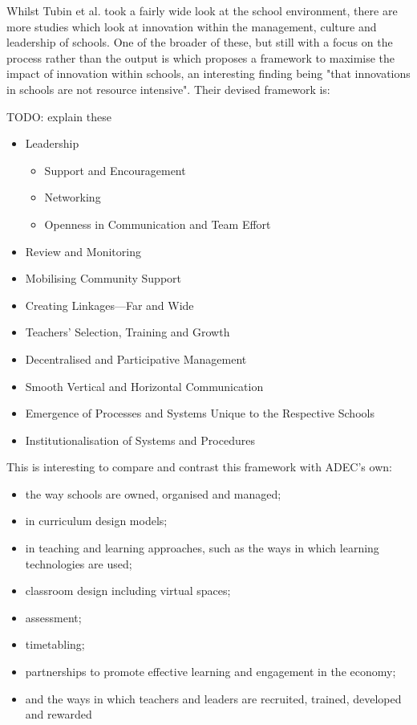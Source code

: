 Whilst Tubin et al. took a fairly wide look at the school environment, there are more studies which look at innovation within the management, culture and leadership of schools. One of the broader of these, but still with a focus on the process rather than the output is \cite{Sharma_2005} which proposes a framework to maximise the impact of innovation within schools, an interesting finding being "that innovations in schools are not resource intensive". Their devised framework is:

TODO: explain these
\begin{itemize}
\item Leadership
    \begin{itemize}
    \item Support and Encouragement
    \item Networking
    \item Openness in Communication and Team Effort
    \end{itemize}
\item Review and Monitoring
\item Mobilising Community Support
\item Creating Linkages—Far and Wide
\item Teachers’ Selection, Training and Growth
\item Decentralised and Participative Management
\item Smooth Vertical and Horizontal Communication
\item Emergence of Processes and Systems Unique to the Respective Schools
\item Institutionalisation of Systems and Procedures
\end{itemize}

This is interesting to compare and contrast this framework with ADEC's own:

\begin{itemize}
\item the way schools are owned, organised and managed; 
\item in curriculum design models; 
\item in teaching and learning approaches, such as the ways in which learning technologies are used; 
\item classroom design including virtual spaces; 
\item assessment; 
\item timetabling; 
\item partnerships to promote effective learning and engagement in the economy; 
\item and the ways in which teachers and leaders are recruited, trained, developed and rewarded
\end{itemize}

